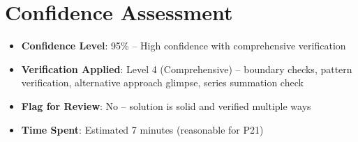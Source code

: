 \documentclass[]{article}
\begin{document}
\section*{Confidence Assessment}
\begin{itemize}[leftmargin=*]
    \item \textbf{Confidence Level}: 95\% -- High confidence with comprehensive verification
    \item \textbf{Verification Applied}: Level 4 (Comprehensive) -- boundary checks, pattern verification, alternative approach glimpse, series summation check
    \item \textbf{Flag for Review}: No -- solution is solid and verified multiple ways
    \item \textbf{Time Spent}: Estimated 7 minutes (reasonable for P21)
\end{itemize}
\end{document}
